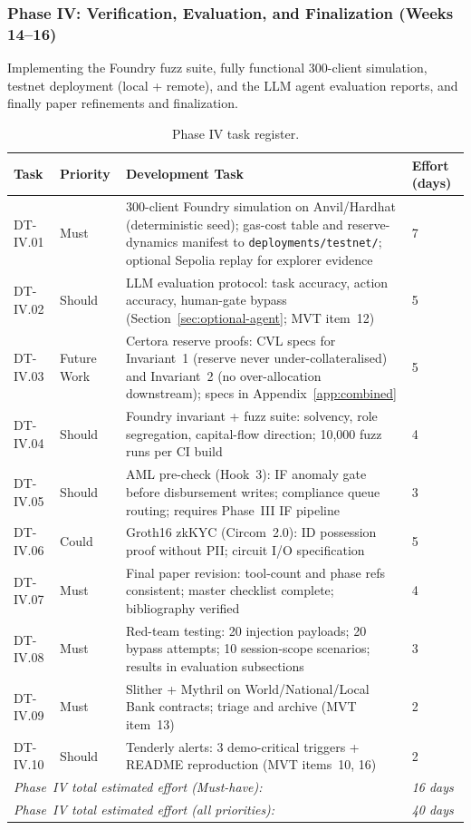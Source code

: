 \subsubsection{Phase IV: Verification, Evaluation, and Finalization (Weeks 14--16)}

Implementing the Foundry fuzz suite, fully functional 300-client simulation, testnet deployment (local + remote), and the LLM agent evaluation reports, and finally paper refinements and finalization.

\begin{table}[H]
\centering
\caption[Phase IV task register]{Phase IV task register.}
\label{tab:phaseIV-tasks}
\begin{tabular}{p{1.8cm}p{1.8cm}p{7.5cm}p{1.5cm}}
\toprule
\tableheadcolor
\textbf{Task} & \textbf{Priority} & \textbf{Development Task} & \textbf{Effort (days)} \\
\midrule
DT-IV.01 & Must & 300-client Foundry simulation on Anvil/Hardhat (deterministic seed); gas-cost table and reserve-dynamics manifest to \texttt{deployments/testnet/}; optional Sepolia replay for explorer evidence & 7 \\
DT-IV.02 & Should & LLM evaluation protocol: task accuracy, action accuracy, human-gate bypass (Section~\ref{sec:optional-agent}; MVT item~12) & 5 \\
DT-IV.03 & Future Work & Certora reserve proofs: CVL specs for Invariant~1 (reserve never under-collateralised) and Invariant~2 (no over-allocation downstream); specs in Appendix~\ref{app:combined} & 5 \\
DT-IV.04 & Should & Foundry invariant + fuzz suite: solvency, role segregation, capital-flow direction; 10{,}000 fuzz runs per CI build & 4 \\
DT-IV.05 & Should & AML pre-check (Hook~3): IF anomaly gate before disbursement writes; compliance queue routing; requires Phase~III IF pipeline & 3 \\
DT-IV.06 & Could & Groth16 zkKYC (Circom~2.0): ID possession proof without PII; circuit I/O specification & 5 \\
DT-IV.07 & Must & Final paper revision: tool-count and phase refs consistent; master checklist complete; bibliography verified & 4 \\
DT-IV.08 & Must & Red-team testing: 20 injection payloads; 20 bypass attempts; 10 session-scope scenarios; results in evaluation subsections & 3 \\
DT-IV.09 & Must & Slither + Mythril on World/National/Local Bank contracts; triage and archive (MVT item~13) & 2 \\
DT-IV.10 & Should & Tenderly alerts: 3 demo-critical triggers + README reproduction (MVT items~10, 16) & 2 \\
\multicolumn{3}{l}{\textit{Phase~IV total estimated effort (Must-have):}} & \textit{16 days} \\
\multicolumn{3}{l}{\textit{Phase~IV total estimated effort (all priorities):}} & \textit{40 days} \\
\bottomrule
\end{tabular}
\end{table}

